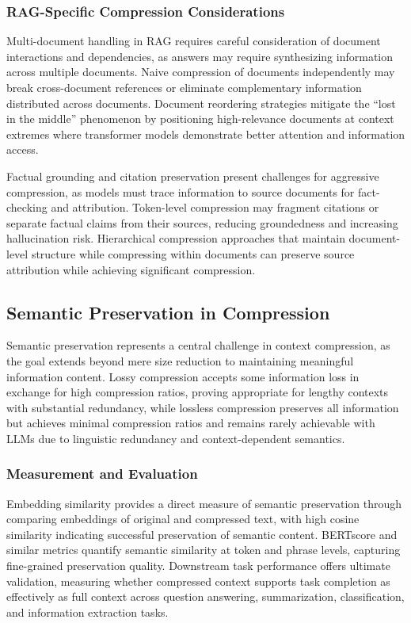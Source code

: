 \subsubsection{RAG-Specific Compression Considerations}

Multi-document handling in RAG requires careful consideration of document interactions and dependencies, as answers may require synthesizing information across multiple documents. Naive compression of documents independently may break cross-document references or eliminate complementary information distributed across documents. Document reordering strategies mitigate the ``lost in the middle'' phenomenon by positioning high-relevance documents at context extremes where transformer models demonstrate better attention and information access.

Factual grounding and citation preservation present challenges for aggressive compression, as models must trace information to source documents for fact-checking and attribution. Token-level compression may fragment citations or separate factual claims from their sources, reducing groundedness and increasing hallucination risk. Hierarchical compression approaches that maintain document-level structure while compressing within documents can preserve source attribution while achieving significant compression.

\subsection{Semantic Preservation in Compression}

Semantic preservation represents a central challenge in context compression, as the goal extends beyond mere size reduction to maintaining meaningful information content. Lossy compression accepts some information loss in exchange for high compression ratios, proving appropriate for lengthy contexts with substantial redundancy, while lossless compression preserves all information but achieves minimal compression ratios and remains rarely achievable with LLMs due to linguistic redundancy and context-dependent semantics.

\subsubsection{Measurement and Evaluation}

Embedding similarity provides a direct measure of semantic preservation through comparing embeddings of original and compressed text, with high cosine similarity indicating successful preservation of semantic content. BERTscore and similar metrics quantify semantic similarity at token and phrase levels, capturing fine-grained preservation quality. Downstream task performance offers ultimate validation, measuring whether compressed context supports task completion as effectively as full context across question answering, summarization, classification, and information extraction tasks.

